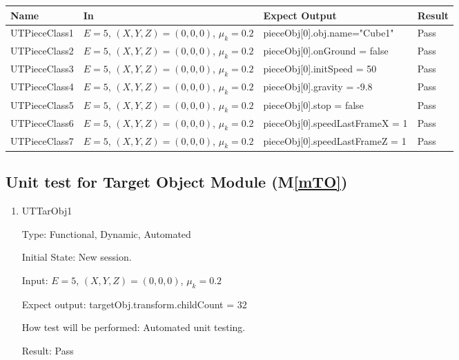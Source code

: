 \documentclass[12pt, titlepage]{article}
\newcommand{\mref}[1]{M\ref{#1}}
\begin{document}
\begin{center}
	\begin{tabular}{p{2.5cm} p{4cm} p{6cm} p{4cm}}
		\hline
		\textbf{Name} & \textbf{In} & \textbf{Expect Output} & \textbf{Result} \\
		\hline
		UTPieceClass1 &$E = 5$, $(X,Y,Z) = (0,0,0)$, $\mu_{k} = 0.2$ &pieceObj[0].obj.name="Cube1"&Pass\\
		UTPieceClass2 &$E = 5$, $(X,Y,Z) = (0,0,0)$, $\mu_{k} = 0.2$ &pieceObj[0].onGround = false&Pass\\
		UTPieceClass3 &$E = 5$, $(X,Y,Z) = (0,0,0)$, $\mu_{k} = 0.2$ &pieceObj[0].initSpeed = 50&Pass\\
		UTPieceClass4 &$E = 5$, $(X,Y,Z) = (0,0,0)$, $\mu_{k} = 0.2$ &pieceObj[0].gravity = -9.8&Pass\\
		UTPieceClass5 &$E = 5$, $(X,Y,Z) = (0,0,0)$, $\mu_{k} = 0.2$ &pieceObj[0].stop = false&Pass\\
		UTPieceClass6 &$E = 5$, $(X,Y,Z) = (0,0,0)$, $\mu_{k} = 0.2$ &pieceObj[0].speedLastFrameX = 1&Pass\\
		UTPieceClass7 &$E = 5$, $(X,Y,Z) = (0,0,0)$, $\mu_{k} = 0.2$ &pieceObj[0].speedLastFrameZ = 1&Pass\\
		\hline		
	\end{tabular}
\end{center}

\subsection{Unit test for Target Object Module (\mref{mTO})}
\label{Sec_UmTO}
\begin{enumerate}
	
	\item{UTTarObj1\\}
	
	Type: Functional, Dynamic, Automated
	
	Initial State: New session.
	
	Input: $E = 5$, $(X,Y,Z) = (0,0,0)$, $\mu_{k} = 0.2$
	
	Expect output: targetObj.transform.childCount = 32
	
	How test will be performed: Automated unit testing.
	
	Result: Pass
\end{enumerate}
\end{document}
